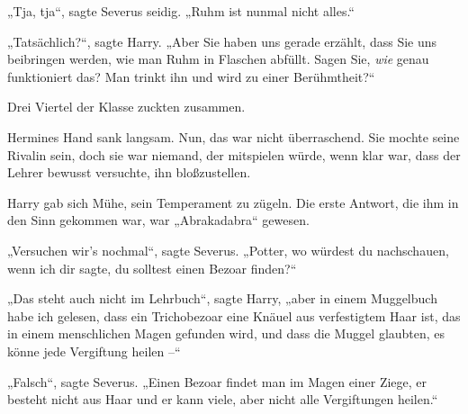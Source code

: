„Tja, tja“, sagte Severus seidig. „Ruhm ist nunmal nicht alles.“ 

„Tatsächlich?“, sagte Harry. „Aber Sie haben uns gerade erzählt, dass Sie uns beibringen werden, wie man Ruhm in Flaschen abfüllt. Sagen Sie, \emph{wie} genau funktioniert das? Man trinkt ihn und wird zu einer Berühmtheit?“ 

Drei Viertel der Klasse zuckten zusammen. 

Hermines Hand sank langsam. Nun, das war nicht überraschend. Sie mochte seine Rivalin sein, doch sie war niemand, der mitspielen würde, wenn klar war, dass der Lehrer bewusst versuchte, ihn bloßzustellen. 

Harry gab sich Mühe, sein Temperament zu zügeln. Die erste Antwort, die ihm in den Sinn gekommen war, war „Abrakadabra“ gewesen. 

„Versuchen wir’s nochmal“, sagte Severus. „Potter, wo würdest du nachschauen, wenn ich dir sagte, du solltest einen Bezoar finden?“ 

„Das steht auch nicht im Lehrbuch“, sagte Harry, „aber in einem Muggelbuch habe ich gelesen, dass ein Trichobezoar eine Knäuel aus verfestigtem Haar ist, das in einem menschlichen Magen gefunden wird, und dass die Muggel glaubten, es könne jede Vergiftung heilen –“ 

„Falsch“, sagte Severus. „Einen Bezoar findet man im Magen einer Ziege, er besteht nicht aus Haar und er kann viele, aber nicht alle Vergiftungen heilen.“ 

